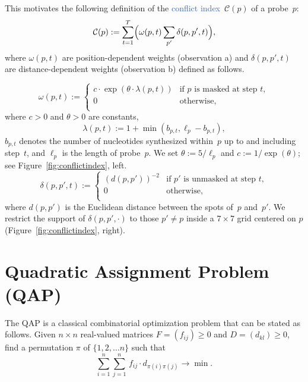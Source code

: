 \documentclass[portrait]{a0poster}
\begin{document}
\begin{multicols}{3}[\aggiheader]
\noindent This motivates the following definition of the
\textcolor{highlight}{conflict index}~$\mathcal{C}(p)$ of a probe~$p$:
\[
\mathcal{C}(p) := \sum_{t=1}^{T} \Bigl( \omega(p,t) \sum_{p'} \delta(p,p',t) \Bigr),
\]
where $\omega(p,t)$ are position-dependent weights (observation a) and
$\delta(p,p',t)$ are distance-dependent weights (observation b) defined as
follows.


\[
\omega(p,t) :=
\left\{
\begin{array}{ll}
c \cdot \exp{\left(\theta \cdot \lambda(p,t)\right)} & \mbox{if $p$ is masked at step $t$}, \\
0 & \mbox{otherwise}, \\
\end{array}
\right.
\]
where $c>0$ and $\theta>0$ are constants,
\[
\lambda(p,t) := 1 + \min(b_{p,t},\ell_{p} - b_{p,t}),
\]
$b_{p,t}$ denotes the number of nucleotides synthesized within~$p$ up to and
including step~$t$, and $\ell_{p}$ is the length of probe~$p$. We set
$\theta := 5/\ell_p$ and $c := 1/\exp(\theta)$; see
Figure~\ref{fig:conflictindex}, left.
\[
\delta(p,p',t) :=
\left\{
\begin{array}{ll}
(d(p,p'))^{-2} & \mbox{if $p'$ is unmasked at step $t$}, \\
             0 & \mbox{otherwise}, \\
\end{array}
\right.
\]
where $d(p,p')$ is the Euclidean distance between the spots of~$p$ and~$p'$.
We restrict the support of $\delta(p,p',\cdot)$ to those $p'\neq p$ inside
a $7\times 7$ grid centered on $p$ (Figure~\ref{fig:conflictindex}, right).

\section*{\textcolor{aggigreen}{Quadratic Assignment Problem (QAP)}}

\noindent The QAP is a classical combinatorial optimization problem that can be
stated as follows. Given $n \times n$ real-valued matrices $F = (f_{ij})\geq 0$ and $D = (d_{kl})\geq 0$, find a permutation $\pi$ of $\{1, 2, \ldots n\}$ such that
\[
  \sum_{i=1}^{n} \sum_{j=1}^{n}\,  f_{ij} \cdot d_{\pi(i)\pi(j)} \to \min.
\]


\end{multicols}
\end{document}
